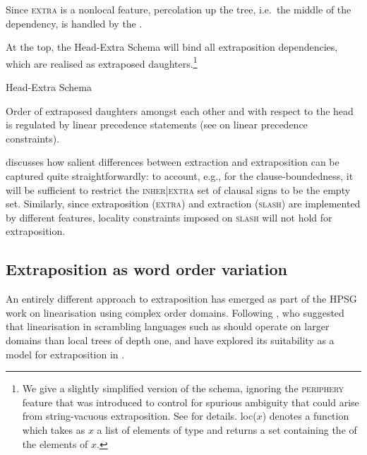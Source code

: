 \documentclass[output=paper
,notxmath 
	        ,collection
	        ,collectionchapter
 	        ,biblatex
                ,babelshorthands
                ,newtxmath
                ,draftmode
                ,colorlinks, citecolor=brown
]{langscibook}
\begin{document}
Since \textsc{extra} is a nonlocal feature, percolation up the tree,
i.e.\ the middle of the dependency, is handled by the 
\citep[]{Pollard:Sag:94}.

At the top, the Head-Extra Schema will bind all extraposition
dependencies, which are realised as extraposed daughters.\footnote{We
  give a slightly simplified version of the schema, ignoring the
  \textsc{periphery} feature that was introduced to control for spurious
  ambiguity that could arise from string-vacuous extraposition. See
  \citet[--305]{Keller:95} for details. \textsf{loc($x$)} denotes a function
  which takes as $x$ a list of elements of type  and
  returns a set containing the \locvs of the elements of $x$.}
\begin{exe}
  \ex Head-Extra Schema

\end{exe}

Order of extraposed daughters amongst each other and with respect to
the head is regulated by linear precedence statements (see  on linear
precedence constraints).

\citet{Keller:95} discusses how salient differences between extraction
and extraposition can be captured quite straightforwardly: to account,
e.g., for the clause-boundedness, it will be sufficient to restrict
the \textsc{inher|extra} set of clausal signs to be the empty
set. Similarly, since extraposition (\textsc{extra}) and extraction
(\textsc{slash}) are implemented by different features, locality
constraints imposed on \textsc{slash} will not hold for extraposition.


\subsection{Extraposition as word order variation}

An entirely different approach to extraposition has emerged as part of
the HPSG work on linearisation using complex order domains. Following
\citet{Reape:94}, who suggested that linearisation in scrambling
languages such as  should operate on larger domains than local
trees of depth one, \citet{Kathol:95b,kathol_a00} and \citet{KP95a}
have explored its suitability as a model for extraposition in .
\end{document}
